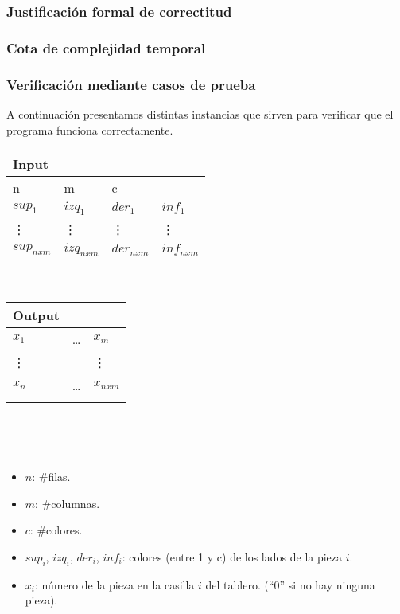 \documentclass[11pt, a4paper, twoside]{article}
\begin{document}
\subsubsection{Justificación formal de correctitud}

\subsubsection{Cota de complejidad temporal}

\subsubsection{Verificación mediante casos de prueba}

A continuación presentamos distintas instancias que sirven para verificar que el programa funciona correctamente.\\

\begin{center}
\begin{minipage}{0.5\textwidth}
	\begin{tabular}{llll}
		Input  \\
		\hline
		n       & m       & c       &         \\
		$sup_1$ & $izq_1$ & $der_1$ & $inf_1$ \\
		\vdots & \vdots   & \vdots  & \vdots  \\
		$sup_{nxm}$ & $izq_{nxm}$ & $der_{nxm}$ & $inf_{nxm}$ \\ 
	\end{tabular} \\  
\end{minipage}
\begin{minipage}{0.5\textwidth}	
	\begin{tabular}{lll}
		Output  \\
		\hline
		$x_1$ & \dots & $x_m$ \\
		\vdots&       & \vdots \\
		$x_n$ & \dots & $x_{nxm}$ \\
		 \\
	\end{tabular} \\
\end{minipage} \\

\begin{minipage}{0.5\textwidth}
\begin{itemize}
	\item{$n$}: \#filas.
	\item{$m$}: \#columnas.
	\item{$c$}: \#colores.
	\item{$sup_i$, $izq_i$, $der_i$, $inf_i$}: colores (entre 1 y c) de los lados de la pieza $i$.
	\item{$x_i$}: número de la pieza en la casilla $i$ del tablero. (``0'' si no hay ninguna pieza).
\end{itemize}
\end{minipage}
\end{center}
\end{document}
